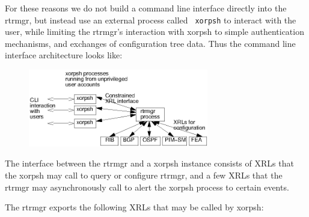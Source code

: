 \documentclass[11pt]{article}
\begin{document}
For these reasons we do not build a command line interface directly
into the rtrmgr, but instead use an external process called {\tt
xorpsh} to interact with the user, while limiting the rtrmgr's
interaction with xorpsh to simple authentication mechanisms, and
exchanges of configuration tree data.  Thus the command line interface
architecture looks like:

\begin{figure}[htb]
\centerline{\includegraphics[width=0.7\textwidth]{figs/xorpsh}}
\vspace{.05in}
\end{figure}

The interface between the rtrmgr and a xorpsh instance consists of
XRLs that the xorpsh may call to query or configure rtrmgr, and a few
XRLs that the rtrmgr may asynchronously call to alert the xorpsh
process to certain events.

The rtrmgr exports the following XRLs that may be called by xorpsh:
\end{document}
